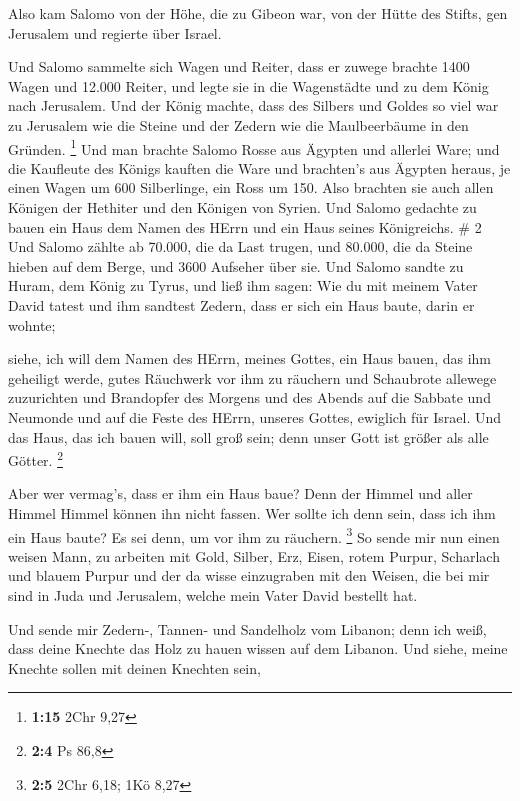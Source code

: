  Also kam Salomo von der Höhe, die zu Gibeon war, von der
Hütte des Stifts, gen Jerusalem und regierte über Israel.

 Und Salomo sammelte sich Wagen und Reiter, dass er zuwege
brachte 1400 Wagen und 12.000 Reiter, und legte sie in die Wagenstädte
und zu dem König nach Jerusalem.  Und der König machte,
dass des Silbers und Goldes so viel war zu Jerusalem wie die Steine und
der Zedern wie die Maulbeerbäume in den Gründen. \footnote{\textbf{1:15}
  2Chr 9,27}  Und man brachte Salomo Rosse aus Ägypten und
allerlei Ware; und die Kaufleute des Königs kauften die Ware
 und brachten's aus Ägypten heraus, je einen Wagen um 600
Silberlinge, ein Ross um 150. Also brachten sie auch allen Königen der
Hethiter und den Königen von Syrien.  Und Salomo gedachte
zu bauen ein Haus dem Namen des HErrn und ein Haus seines Königreichs.
\# 2  Und Salomo zählte ab 70.000, die da Last trugen, und
80.000, die da Steine hieben auf dem Berge, und 3600 Aufseher über sie.
 Und Salomo sandte zu Huram, dem König zu Tyrus, und ließ
ihm sagen: Wie du mit meinem Vater David tatest und ihm sandtest Zedern,
dass er sich ein Haus baute, darin er wohnte;

 siehe, ich will dem Namen des HErrn, meines Gottes, ein
Haus bauen, das ihm geheiligt werde, gutes Räuchwerk vor ihm zu räuchern
und Schaubrote allewege zuzurichten und Brandopfer des Morgens und des
Abends auf die Sabbate und Neumonde und auf die Feste des HErrn, unseres
Gottes, ewiglich für Israel.  Und das Haus, das ich bauen
will, soll groß sein; denn unser Gott ist größer als alle Götter.
\footnote{\textbf{2:4} Ps 86,8}

 Aber wer vermag's, dass er ihm ein Haus baue? Denn der
Himmel und aller Himmel Himmel können ihn nicht fassen. Wer sollte ich
denn sein, dass ich ihm ein Haus baute? Es sei denn, um vor ihm zu
räuchern. \footnote{\textbf{2:5} 2Chr 6,18; 1Kö 8,27}  So
sende mir nun einen weisen Mann, zu arbeiten mit Gold, Silber, Erz,
Eisen, rotem Purpur, Scharlach und blauem Purpur und der da wisse
einzugraben mit den Weisen, die bei mir sind in Juda und Jerusalem,
welche mein Vater David bestellt hat.

 Und sende mir Zedern-, Tannen- und Sandelholz vom Libanon;
denn ich weiß, dass deine Knechte das Holz zu hauen wissen auf dem
Libanon. Und siehe, meine Knechte sollen mit deinen Knechten sein,


